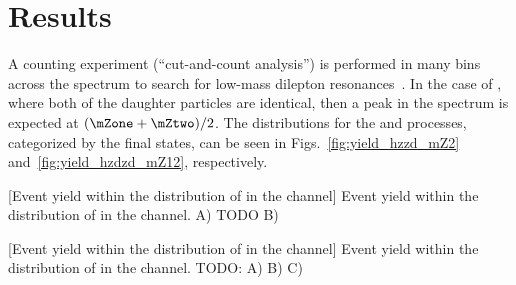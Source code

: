 \section{Results}
\label{sec:results_dilep}
A counting experiment (``cut-and-count analysis'') is performed in many bins across the \mZtwo spectrum to search for low-mass dilepton resonances~\cite{CMS:2021pcy}.
In the case of \htozdzd, where both of the daughter particles are identical, then a peak in the \mZtwo spectrum is expected at $(\mZone + \mZtwo) / 2$.
The \mZtwo distributions for the \htozzd and \htozdzd processes, categorized by the \mZtwo final states, can be seen in Figs.~\ref{fig:yield_hzzd_mZ2} and~\ref{fig:yield_hzdzd_mZ12}, respectively.
\begin{multiFigure}
    \centering
        [Event yield within the distribution of \mZtwo in the \htozzd channel]
        {Event yield within the distribution of \mZtwo in the \htozzd channel.
        \;A) TODO
        \;B)}
    \label{fig:yield_hzzd_mZ2}
\end{multiFigure}
\begin{multiFigure}
    \centering
        [Event yield within the distribution of \mZtwo in the \htozdzd channel]
        {Event yield within the distribution of \mZtwo in the \htozdzd channel.
        TODO:
        \;A)
        \;B)
        \;C)}
    \label{fig:yield_hzdzd_mZ12}
\end{multiFigure}

